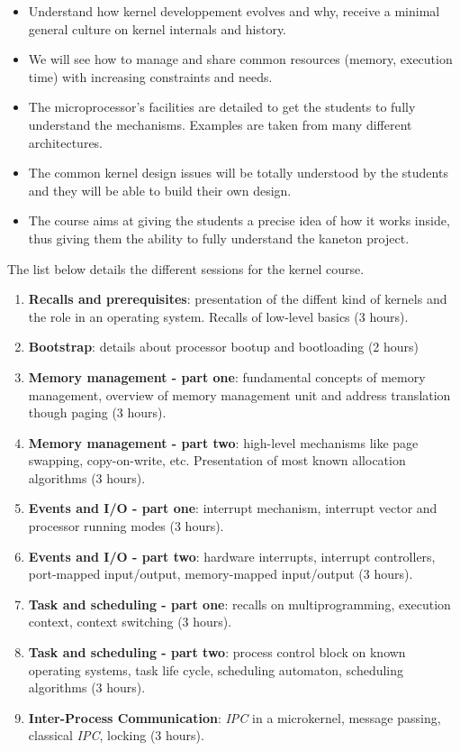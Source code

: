 \begin{multicols}{2}
\begin{itemize}
  \item
    Understand how kernel developpement evolves and why, receive a
    minimal general culture on kernel internals and history.
  \item
    We will see how to manage and share common resources (memory,
    execution time) with increasing constraints and needs.
  \item
    The microprocessor's facilities are detailed to get the students
    to fully understand the mechanisms. Examples are taken from
    many different architectures.
  \item
    The common kernel design issues will be totally understood by the
    students and they will be able to build their own design.
  \item
    The course aims at giving the students a precise idea of how it
    works inside, thus giving them the ability to fully understand
    the kaneton project.
\end{itemize}

The list below details the different sessions for the kernel course.

\begin{enumerate}
  \item
    \textbf{Recalls and prerequisites}: presentation of the diffent
    kind of kernels and the role in an operating system. Recalls of
    low-level basics (3 hours).
  \item
    \textbf{Bootstrap}: details about processor bootup and bootloading
    (2 hours)
\item
    \textbf{Memory management - part one}: fundamental concepts of
    memory management, overview of memory management unit and address
    translation though paging (3 hours).
  \item
    \textbf{Memory management - part two}: high-level mechanisms like
    page swapping, copy-on-write, etc. Presentation of most known
    allocation algorithms (3 hours).
  \item
    \textbf{Events and I/O - part one}: interrupt mechanism, interrupt
    vector and processor running modes (3 hours).
  \item
    \textbf{Events and I/O - part two}: hardware interrupts, interrupt
    controllers, port-mapped input/output, memory-mapped input/output
    (3 hours).
  \item
    \textbf{Task and scheduling - part one}: recalls on
    multiprogramming, execution context, context switching (3 hours).
  \item
    \textbf{Task and scheduling - part two}: process control block on
    known operating systems, task life cycle, scheduling automaton,
    scheduling algorithms (3 hours).
  \item
    \textbf{Inter-Process Communication}: \textit{IPC} in a microkernel,
    message passing, classical \textit{IPC}, locking (3 hours).
\end{enumerate}


\end{multicols}
